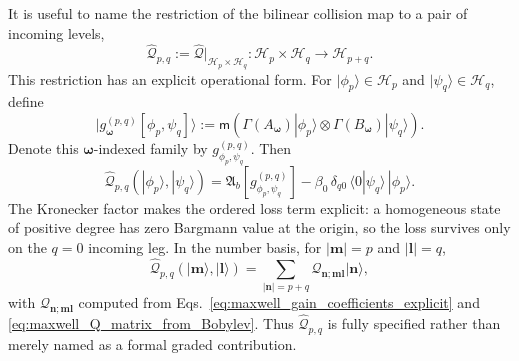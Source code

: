\documentclass[11pt,oneside]{article}
\numberwithin{equation}{section}
\theoremstyle{definition}
\begin{document}
It is useful to name the restriction of the bilinear collision map to a pair of incoming levels,
\begin{equation}
\widehat{\mathcal Q}_{p,q}
:=
\widehat{\mathcal Q}\big|_{\mathscr H_p\times\mathscr H_q}:
\mathscr H_p\times\mathscr H_q
\longrightarrow
\mathscr H_{p+q}.
\label{eq:maxwell_sector_collision_block}
\end{equation}
This restriction has an explicit operational form.  For $|\phi_p\rangle\in\mathscr H_p$ and $|\psi_q\rangle\in\mathscr H_q$, define
\begin{equation}
|g^{(p,q)}_{\bm\omega}[\phi_p,\psi_q]\rangle
:=
\mathsf m\!\left(
\Gamma(A_{\bm\omega})|\phi_p\rangle
\otimes
\Gamma(B_{\bm\omega})|\psi_q\rangle
\right).
\label{eq:maxwell_sector_gain_family}
\end{equation}
Denote this $\bm\omega$-indexed family by $g^{(p,q)}_{\phi_p,\psi_q}$.  Then
\begin{equation}
\widehat{\mathcal Q}_{p,q}(|\phi_p\rangle,|\psi_q\rangle)
=
\mathfrak A_b[g^{(p,q)}_{\phi_p,\psi_q}]
-
\beta_0\,\delta_{q0}\,\langle0|\psi_q\rangle\,|\phi_p\rangle .
\label{eq:maxwell_sector_collision_block_explicit}
\end{equation}
The Kronecker factor makes the ordered loss term explicit: a homogeneous state of positive degree has zero Bargmann value at the origin, so the loss survives only on the $q=0$ incoming leg.  In the number basis, for $|\bm m|=p$ and $|\bm l|=q$,
\begin{equation}
\widehat{\mathcal Q}_{p,q}(|\bm m\rangle,|\bm l\rangle)
=
\sum_{|\bm n|=p+q}
\mathcal Q_{\bm n;\bm m\bm l}|\bm n\rangle,
\label{eq:maxwell_sector_collision_block_basis}
\end{equation}
with $\mathcal Q_{\bm n;\bm m\bm l}$ computed from Eqs.~\eqref{eq:maxwell_gain_coefficients_explicit} and \eqref{eq:maxwell_Q_matrix_from_Bobylev}.  Thus $\widehat{\mathcal Q}_{p,q}$ is fully specified rather than merely named as a formal graded contribution.
\end{document}
